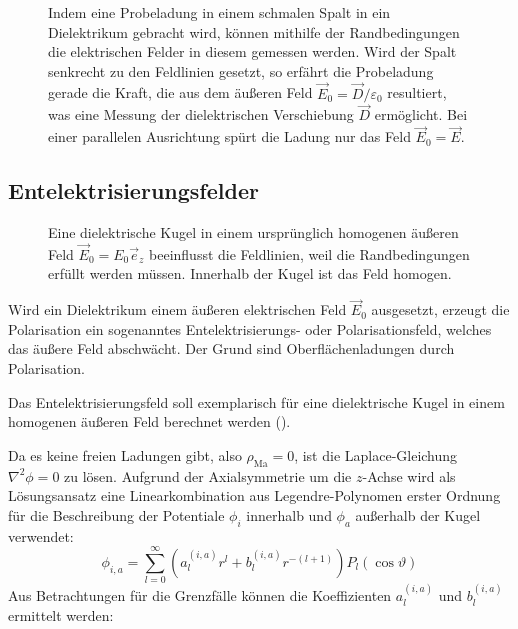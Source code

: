 \begin{figure}[htb]
	\centering
	\tfigMessungVonFeldDurchRandbedingungen
	\caption{Indem eine Probeladung in einem schmalen Spalt in ein Dielektrikum gebracht wird, können mithilfe der Randbedingungen die elektrischen Felder in diesem gemessen werden. Wird der Spalt senkrecht zu den Feldlinien gesetzt, so erfährt die Probeladung gerade die Kraft, die aus dem äußeren Feld $\vec E_0=\vec D/\varepsilon_0$ resultiert, was eine Messung der dielektrischen Verschiebung $\vec D$ ermöglicht. Bei einer parallelen Ausrichtung spürt die Ladung nur das Feld $\vec E_0=\vec E$. }
	\label{fig:measure_fields_in_dielectricum}
\end{figure}




\subsection{Entelektrisierungsfelder}


\begin{figure}[htb]
	\centering
	\tfigDielektrischeKugelHomogenesEFeld
	\caption{Eine dielektrische Kugel in einem ursprünglich homogenen äußeren Feld $\vec E_0=E_0 \vec e_z$ beeinflusst die Feldlinien, weil die Randbedingungen erfüllt werden müssen. Innerhalb der Kugel ist das Feld homogen. }
	\label{fig:dielectric_sphere_in_homogeneous_field}
\end{figure}

Wird ein Dielektrikum einem äußeren elektrischen Feld $\vec {E}_{0}$ ausgesetzt, erzeugt die Polarisation ein sogenanntes Entelektrisierungs- oder Polarisationsfeld, welches das äußere Feld abschwächt. Der Grund sind Oberflächenladungen durch Polarisation.

Das Entelektrisierungsfeld soll exemplarisch für eine dielektrische Kugel in einem homogenen äußeren Feld berechnet werden ().

Da es keine freien Ladungen gibt, also $\rho _{\mathrm{Ma}}=0$, ist die Laplace-Gleichung $\nabla ^{2}\phi =0$ zu lösen. Aufgrund der Axialsymmetrie um die $z$-Achse wird als Lösungsansatz eine Linearkombination aus Legendre-Polynomen erster Ordnung für die Beschreibung der Potentiale $\phi _{i}$ innerhalb und $\phi _{a}$ außerhalb der Kugel verwendet:
\begin{equation*}
	\phi _{i,a}=\sum _{l=0}^{\infty }\left(a_{l}^{\left(i,a\right)}r^{l}+b_{l}^{\left(i,a\right)}r^{-\left(l+1\right)}\right)P_{l}\left(\cos \vartheta \right)
\end{equation*}
Aus Betrachtungen für die Grenzfälle können die Koeffizienten $a_{l}^{\left(i,a\right)}$ und $b_{l}^{\left(i,a\right)}$ ermittelt werden:

